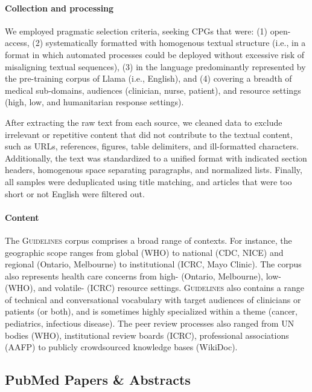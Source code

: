 \documentclass{article}
\newcommand{\guidelines}{\textsc{Guidelines} }
\begin{document}
\vspace{-5pt}
\paragraph{Collection and processing} 

We employed pragmatic selection criteria, seeking CPGs that were: (1) open-access, (2) systematically formatted with homogenous textual structure (i.e., in a format in which automated processes could be deployed without excessive risk of misaligning textual sequences), (3) in the language predominantly represented by the pre-training corpus of Llama (i.e., English), and (4) covering a breadth of medical sub-domains, audiences (clinician, nurse, patient), and resource settings (high, low, and humanitarian response settings).


After extracting the raw text from each source, we cleaned data to exclude irrelevant or repetitive content that did not contribute to the textual content, such as URLs, references, figures, table delimiters, and ill-formatted characters. 
Additionally, the text was standardized to a unified format with indicated section headers, homogenous space separating paragraphs, and normalized lists. 
Finally, all samples were deduplicated using title matching, and articles that were too short or not English were filtered out. 

\vspace{-5pt}
\paragraph{Content} 
The \guidelines corpus comprises a broad range of contexts. For instance, the geographic scope ranges from global (WHO) to national (CDC, NICE) and regional (Ontario, Melbourne) to institutional (ICRC, Mayo Clinic). The corpus also represents health care concerns from high- (Ontario, Melbourne), low- (WHO), and volatile- (ICRC) resource settings.
\guidelines{} also contains a range of technical and conversational vocabulary with target audiences of clinicians or patients (or both), and is sometimes highly specialized within a theme (cancer, pediatrics, infectious disease). The peer review processes also ranged from UN bodies (WHO), institutional review boards (ICRC), professional associations (AAFP) to publicly crowdsourced knowledge bases (WikiDoc). 


\subsection{PubMed Papers \& Abstracts} \label{sec:2-data-pubmed}
\end{document}
